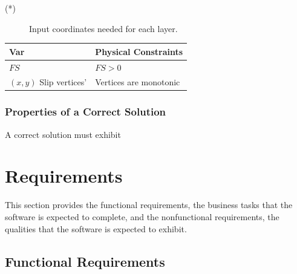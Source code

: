\documentclass[12pt]{article}
\renewcommand{\arraystretch}{1}
\begin{document}
\noindent \begin{description}
\item[(*)] Input coordinates needed for each layer.
\end{description}

\begin{table}[!h]
\caption{Output Variables} 
\renewcommand{\arraystretch}{1.2} 
\noindent \begin{longtable*}{l l} 
  \toprule \label{TblOutputVar}
  \textbf{Var} & \textbf{Physical Constraints} \\
  \midrule 
  $FS$ & $FS>0$ \\
  $(x,y)$ Slip vertices' &  Vertices are monotonic \\
  \bottomrule
\end{longtable*}
\end{table}

\subsubsection{Properties of a Correct Solution} \label{sec_CorrectSolution}

\noindent
A correct solution must exhibit



\section{Requirements}

This section provides the functional requirements, the business tasks
that the software is expected to complete, and the nonfunctional
requirements, the qualities that the software is expected to exhibit.

\subsection{Functional Requirements}
\end{document}
